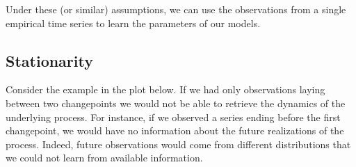 \documentclass[
]{book}
\begin{document}
Under these (or similar) assumptions, we can use the observations from a single empirical time series to learn the parameters of our models.

\hypertarget{stationarity}{%
\subsection*{Stationarity}\label{stationarity}}

Consider the example in the plot below. If we had only observations laying between two changepoints we would not be able to retrieve the dynamics of the underlying process. For instance, if we observed a series ending before the first changepoint, we would have no information about the future realizations of the process. Indeed, future observations would come from different distributions that we could not learn from available information.
\end{document}
